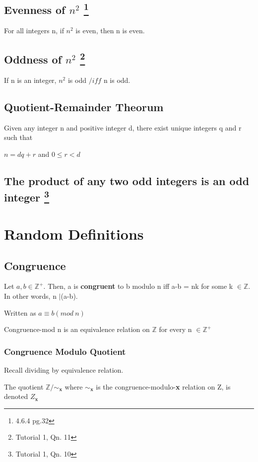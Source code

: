 \documentclass{article}
\begin{document}
\subsection[Evenness of $n^2$]{Evenness of $n^2$   \footnote{4.6.4 pg.32}}
For all integers n, if $n^2$ is even, then n is even.

\subsection[Oddness of $n^2$]{Oddness of $n^2$   \footnote{Tutorial 1, Qn. 11}}
If n is an integer, $n^2$ is odd $/iff$ n is odd.

\subsection{Quotient-Remainder Theorum}
Given any integer n and positive integer d, there exist unique integers q and r such that

$n = dq + r$ and $0\leq r < d$

\subsection[The product of any two odd integers is an odd integer]{The product of any two odd integers is an odd integer \footnote{Tutorial 1, Qn. 10}}

\section{Random Definitions}
\subsection{Congruence}
Let $a,b \in \mathbb{Z}^+.$ Then, a is \textbf{congruent} to b modulo n iff a-b = nk for some k $\in \mathbb{Z}$. In other words, n $\mid$(a-b).

Written as $a\equiv b (mod\ n)$

Congruence-mod n is an equivalence relation on $\mathbb{Z}$ for every n $\in \mathbb{Z}^+$

\subsubsection{Congruence Modulo Quotient}
Recall dividing by equivalence relation.

The quotient $\mathbb{Z} /\sim_\textbf{x}$ where $\sim_\textbf{x}$ is the congruence-modulo-\textbf{x} relation on Z, is denoted $Z_\textbf{x}$
\end{document}
